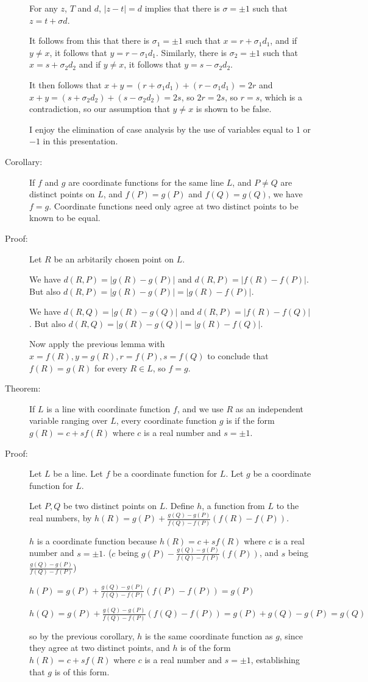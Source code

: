 \documentclass[12pt]{article}
\begin{document}
\begin{description}
For any $z$, $T$ and $d$, $|z-t|=d$ implies that there is $\sigma=\pm 1$ such that $z= t+\sigma d$.

It follows from this that there is $\sigma_1 = \pm 1$ such that $x=r+\sigma_1 d_1$, and if $y \neq x$, it follows
that $y = r-\sigma_1 d_1$.  Similarly, there is $\sigma_2 = \pm 1$ such that $x = s+ \sigma_2 d_2$ and
if $y \neq x$, it follows that $y = s-\sigma_2d_2$.

It then follows that $x+y = (r + \sigma_1 d_1) + (r -\sigma_1d_1) = 2r$ and $x+y = (s + \sigma_2 d_2) + (s -\sigma_2d_2) = 2s$, so $2r=2s$, so $r=s$, which is a contradiction, so our assumption that $y \neq x$ is shown to be false.

I enjoy the elimination of case analysis by the use of variables equal to 1 or $-1$ in this presentation.

\item[Corollary:] If $f$ and $g$ are coordinate functions for the same line $L$, and $P \neq Q$ are distinct points on $L$, and $f(P) = g(P)$ and $f(Q)=g(Q)$, we have $f=g$.  Coordinate functions need only agree at two distinct points to be known to be equal.

\item[Proof:]  Let $R$ be an arbitarily chosen point on $L$.  

We have $d(R,P) = |g(R)-g(P)|$ and  $d(R,P) = |f(R)-f(P)|$.
But also $d(R,P) = |g(R)-g(P)|=|g(R)-f(P)|$.

We have $d(R,Q) = |g(R)-g(Q)|$ and  $d(R,P) = |f(R)-f(Q)|$.
But also $d(R,Q) = |g(R)-g(Q)|=|g(R)-f(Q)|$.

Now apply the previous lemma with $x = f(R), y= g(R), r = f(P), s = f(Q)$ to conclude that $f(R)=g(R)$ for every $R \in L$, so $f=g$.

\item[Theorem:]  If $L$ is a line with coordinate function $f$, and we use $R$ as an independent variable ranging over $L$, every coordinate function $g$ is if the form $g(R) = c + sf(R)$ where $c$ is a real number and
$s=\pm 1$.

\item[Proof:]  Let $L$ be a line.  Let $f$ be a coordinate function for $L$.  Let $g$ be a coordinate function for $L$.

Let $P,Q$ be two distinct points on $L$.  Define $h$, a function from $L$ to the real numbers, by $h(R) = g(P)  + \frac{g(Q)-g(P)}{f(Q)-f(P)}(f(R)-f(P))$.

$h$ is a coordinate function because $h(R)=c + sf(R)$ where $c$ is a real number and
$s=\pm 1$. ($c$ being $g(P) - \frac{g(Q)-g(P)}{f(Q)-f(P)}(f(P))$, and $s$ being $\frac{g(Q)-g(P)}{f(Q)-f(P)}$)

$h(P) = g(P)  + \frac{g(Q)-g(P)}{f(Q)-f(P)}(f(P)-f(P)) = g(P)$

$h(Q) = g(P)  + \frac{g(Q)-g(P)}{f(Q)-f(P)}(f(Q)-f(P)) = g(P) + g(Q)-g(P) = g(Q)$

so by the previous corollary, $h$ is the same coordinate function as $g$, since they agree at two distinct points, and $h$ is of the form $h(R) = c + sf(R)$ where $c$ is a real number and
$s=\pm 1$, establishing that $g$ is of this form.

\end{description}
\end{document}
